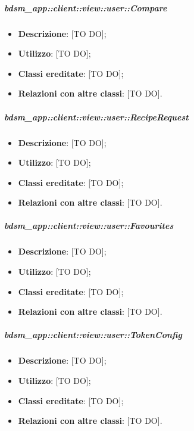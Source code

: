 			\subparagraph{bdsm\_app::client::view::user::Compare} %
			\label{subp:bdsm_app_client_view_user_compare}
				\begin{itemize}
					\item \textbf{Descrizione}: [TO DO];
					\item \textbf{Utilizzo}: [TO DO];
					\item \textbf{Classi ereditate}: [TO DO];
					\item \textbf{Relazioni con altre classi}: [TO DO].
				\end{itemize}

			\subparagraph{bdsm\_app::client::view::user::RecipeRequest} %
			\label{subp:bdsm_app_client_view_user_reciperequest}
				\begin{itemize}
					\item \textbf{Descrizione}: [TO DO];
					\item \textbf{Utilizzo}: [TO DO];
					\item \textbf{Classi ereditate}: [TO DO];
					\item \textbf{Relazioni con altre classi}: [TO DO].
				\end{itemize}

			\subparagraph{bdsm\_app::client::view::user::Favourites} %
			\label{subp:bdsm_app_client_view_user_favourites}
				\begin{itemize}
					\item \textbf{Descrizione}: [TO DO];
					\item \textbf{Utilizzo}: [TO DO];
					\item \textbf{Classi ereditate}: [TO DO];
					\item \textbf{Relazioni con altre classi}: [TO DO].
				\end{itemize}

			\subparagraph{bdsm\_app::client::view::user::TokenConfig} %
			\label{subp:bdsm_app_client_view_user_tokenconfig}
				\begin{itemize}
					\item \textbf{Descrizione}: [TO DO];
					\item \textbf{Utilizzo}: [TO DO];
					\item \textbf{Classi ereditate}: [TO DO];
					\item \textbf{Relazioni con altre classi}: [TO DO].
				\end{itemize}

